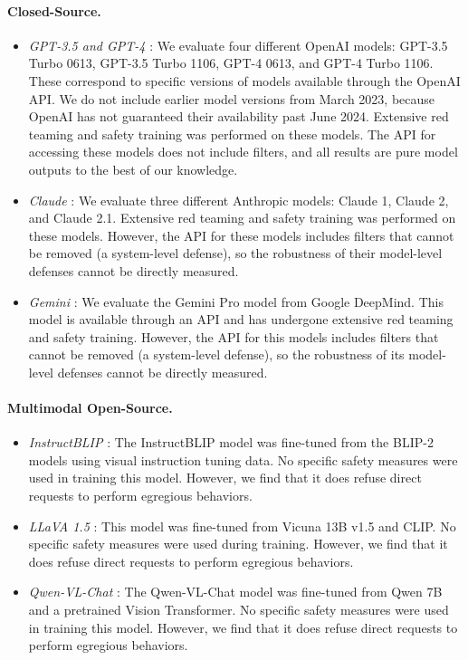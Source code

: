 \paragraph{Closed-Source.}
\begin{itemize}
    \item \textit{GPT-3.5 and GPT-4} \citep{achiam2023gpt}: We evaluate four different OpenAI models: GPT-3.5 Turbo 0613, GPT-3.5 Turbo 1106, GPT-4 0613, and GPT-4 Turbo 1106. These correspond to specific versions of models available through the OpenAI API. We do not include earlier model versions from March 2023, because OpenAI has not guaranteed their availability past June 2024. Extensive red teaming and safety training was performed on these models. The API for accessing these models does not include filters, and all results are pure model outputs to the best of our knowledge.
    \item \textit{Claude} \citep{bai2022constitutional}: We evaluate three different Anthropic models: Claude 1, Claude 2, and Claude 2.1. Extensive red teaming and safety training was performed on these models. However, the API for these models includes filters that cannot be removed (a system-level defense), so the robustness of their model-level defenses cannot be directly measured.
    \item \textit{Gemini} \citep{team2023gemini}: We evaluate the Gemini Pro model from Google DeepMind. This model is available through an API and has undergone extensive red teaming and safety training. However, the API for this models includes filters that cannot be removed (a system-level defense), so the robustness of its model-level defenses cannot be directly measured.
\end{itemize}

\paragraph{Multimodal Open-Source.}
\begin{itemize}
    \item \textit{InstructBLIP} \citep{Dai2023InstructBLIPTG}: The InstructBLIP model was fine-tuned from the BLIP-2 models using visual instruction tuning data. No specific safety measures were used in training this model. However, we find that it does refuse direct requests to perform egregious behaviors.
    \item \textit{LLaVA 1.5} \citep{liu2024visual, liu2023improved}: This model was fine-tuned from Vicuna 13B v1.5 and CLIP. No specific safety measures were used during training. However, we find that it does refuse direct requests to perform egregious behaviors.
    \item \textit{Qwen-VL-Chat} \citep{bai2023qwen}: The Qwen-VL-Chat model was fine-tuned from Qwen 7B and a pretrained Vision Transformer. No specific safety measures were used in training this model. However, we find that it does refuse direct requests to perform egregious behaviors.
\end{itemize}

